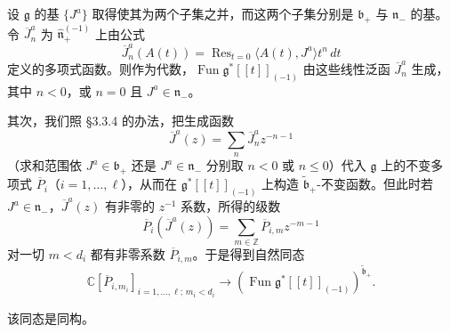 
设 $\mathfrak g$ 的基 $\{J^a\}$ 取得使其为两个子集之并，而这两个子集分别是 $\mathfrak b_+$ 与 $\mathfrak n_-$ 的基。令 $\overline J^a_n$ 为 $\hat{\mathfrak n}^{(-1)}_+$ 上由公式
\begin{equation}
    \overline J^a_n(A(t))=\operatorname{Res}_{t=0}\langle A(t),J^a\rangle t^n\,dt
    \tag{8.1-4}
\end{equation}
定义的多项式函数。则作为代数，$\operatorname{Fun}\mathfrak g^*[\![t]\!]_{(-1)}$ 由这些线性泛函 $\overline J^a_n$ 生成，其中 $n<0$，或 $n=0$ 且 $J^a\in\mathfrak n_-$。


其次，我们照 §3.3.4 的办法，把生成函数
\[
    \overline J^a(z)=\sum_n\overline J^a_n z^{-n-1}
\]
（求和范围依 $J^a\in\mathfrak b_+$ 还是 $J^a\in\mathfrak n_-$ 分别取 $n<0$ 或 $n\le0$）代入 $\mathfrak g$ 上的不变多项式 $\overline P_i$（$i=1,\dots,\ell$），从而在 $\mathfrak g^*[\![t]\!]_{(-1)}$ 上构造 $\tilde{\mathfrak b}_+$-不变函数。但此时若 $J^a\in\mathfrak n_-$，$\overline J^a(z)$ 有非零的 $z^{-1}$ 系数，所得的级数
\[
    \overline P_i(\overline J^a(z))=\sum_{m\in\mathbb Z}\overline P_{i,m}z^{-m-1}
\]
对一切 $m<d_i$ 都有非零系数 $\overline P_{i,m}$。于是得到自然同态
\[
    \mathbb C[\overline P_{i,m_i}]_{i=1,\dots,\ell;\,m_i<d_i}\longrightarrow(\operatorname{Fun}\mathfrak g^*[\![t]\!]_{(-1)})^{\tilde{\mathfrak b}_+}.
\]

\begin{lemma}
    该同态是同构。
\end{lemma}

